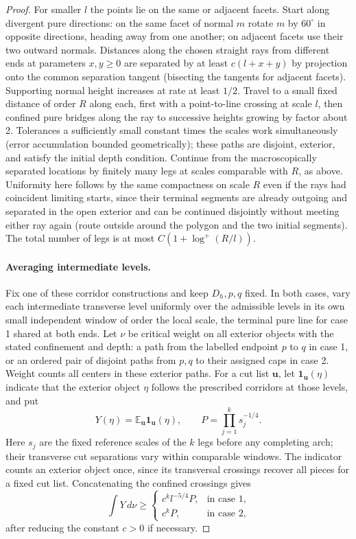 \begin{proof}
For smaller \(l\) the points lie on the same or adjacent facets. Start along divergent pure directions: on the same facet of normal \(m\) rotate \(m\) by \(60^\circ\) in opposite directions, heading away from one another; on adjacent facets use their two outward normals. Distances along the chosen straight rays from different ends at parameters \(x,y\ge0\) are separated by at least \(c(l+x+y)\) by projection onto the common separation tangent (bisecting the tangents for adjacent facets). Supporting normal height increases at rate at least \(1/2\). Travel to a small fixed distance of order \(R\) along each, first with a point-to-line crossing at scale \(l\), then confined pure bridges along the ray to successive heights growing by factor about 2. Tolerances a sufficiently small constant times the scales work simultaneously (error accumulation bounded geometrically); these paths are disjoint, exterior, and satisfy the initial depth condition. Continue from the macroscopically separated locations by finitely many legs at scales comparable with \(R\), as above. Uniformity here follows by the same compactness on scale \(R\) even if the rays had coincident limiting starts, since their terminal segments are already outgoing and separated in the open exterior and can be continued disjointly without meeting either ray again (route outside around the polygon and the two initial segments). The total number of legs is at most \(C(1+\log^+(R/l))\).

\paragraph{Averaging intermediate levels.}
Fix one of these corridor constructions and keep \(D_h,p,q\) fixed. In both cases, vary each intermediate transverse level uniformly over the admissible levels in its own small independent window of order the local scale, the terminal pure line for case 1 shared at both ends. Let \(\nu\) be critical weight on all exterior objects with the stated confinement and depth: a path from the labelled endpoint \(p\) to \(q\) in case 1, or an ordered pair of disjoint paths from \(p,q\) to their assigned caps in case 2. Weight counts all centers in these exterior paths. For a cut list \(\mathbf u\), let \(\mathbf1_{\mathbf u}(\eta)\) indicate that the exterior object \(\eta\) follows the prescribed corridors at those levels, and put
\[
 Y(\eta)=\mathbb E_{\mathbf u}\mathbf1_{\mathbf u}(\eta),
 \qquad P=\prod_{j=1}^k s_j^{-1/4}.
\]
Here \(s_j\) are the fixed reference scales of the \(k\) legs before any completing arch; their transverse cut separations vary within comparable windows. The indicator counts an exterior object once, since its transversal crossings recover all pieces for a fixed cut list. Concatenating the confined crossings gives
\[
 \int Y\,d\nu\ge
 \begin{cases}
 c^k l^{-5/4}P,&\text{in case 1},\\
 c^k P,&\text{in case 2},
 \end{cases}
\]
after reducing the constant \(c>0\) if necessary.


\end{proof}
